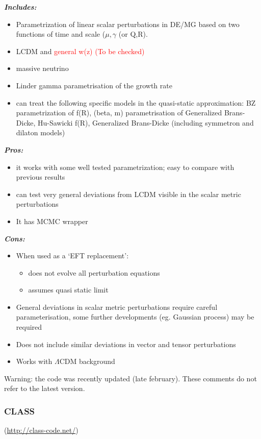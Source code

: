 {\it \bf Includes: }
\begin{itemize}
 \item Parametrization of linear scalar perturbations in DE/MG based on two functions of time and scale ($\mu, \gamma$ (or Q,R).
\item LCDM and \textcolor{red}{general w(z) (To be checked)}
\item massive neutrino
\item Linder gamma parametrisation of the growth rate
\item can treat the following specific models in the quasi-static approximation: BZ parametrization of f(R), (beta, m) parametrisation of Generalized Brans-Dicke, Hu-Sawicki f(R), Generalized Brans-Dicke (including symmetron and dilaton models)

\end{itemize}

{\it \bf Pros: }
\begin{itemize}
 \item it works with some well tested parametrization; easy to compare with previous results 
 \item can test  very general deviations from LCDM visible in the scalar metric perturbations
 \item  It has MCMC wrapper
\end{itemize}

{\it \bf Cons: }
\begin{itemize}
 \item When used as a ‘EFT replacement’:
 \begin{itemize}
  \item does not evolve all perturbation equations 
  \item assumes quasi static limit
 \end{itemize}
 \item General deviations in scalar metric perturbations require careful parameterisation, some further developments (eg. Gaussian process) may be required
 \item Does not include similar deviations in vector and tensor perturbations
 \item Works with $\Lambda$CDM background
\end{itemize}
Warning: the code was recently updated (late february). These comments do not refer to the latest version.\\

\newpage
\subsubsection{CLASS}(\url{http://class-code.net/})\\

